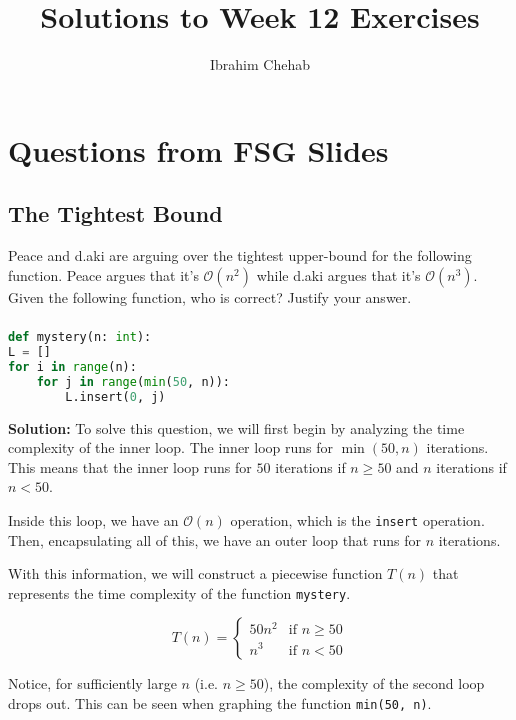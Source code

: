 \documentclass[12pt]{article}
\title{Solutions to Week 12 Exercises}
\author{Ibrahim Chehab}
\begin{document}
\maketitle

\section{Questions from FSG Slides}

\subsection{The Tightest Bound} 
Peace and d.aki are arguing over the tightest upper-bound for the following function. Peace argues that it's $\mathcal{O}(n^2)$ while d.aki argues that it's $\mathcal{O}(n^3)$. Given the following function, who is correct? Justify your answer.

\subsubsection{}

\begin{lstlisting}[language=Python,style=mystyle]
def mystery(n: int):
L = []
for i in range(n):
    for j in range(min(50, n)):
        L.insert(0, j)
\end{lstlisting}

\textbf{Solution:}
To solve this question, we will first begin by analyzing the time complexity of the inner loop. The inner loop runs for $\min(50, n)$ iterations. This means that the inner loop runs for $50$ iterations if $n \geq 50$ and $n$ iterations if $n < 50$.

Inside this loop, we have an $\mathcal{O}(n)$ operation, which is the \texttt{insert} operation. Then, encapsulating all of this, we have an outer loop that runs for $n$ iterations.

With this information, we will construct a piecewise function $T(n)$ that represents the time complexity of the function \texttt{mystery}.

\begin{equation*}
    T(n) = \begin{cases}
        50n^2 & \text{if } n \geq 50 \\
        n^3 & \text{if } n < 50
    \end{cases}
\end{equation*}

Notice, for sufficiently large $n$ (i.e. $n \geq 50$), the complexity of the second loop drops out. This can be seen when graphing the function \texttt{min(50, n)}.
\end{document}

